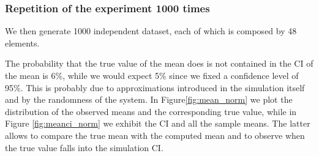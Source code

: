 \documentclass[twoside,onecolumn]{article}
\theoremstyle{definition}
\begin{document}
\subsubsection{Repetition of the experiment 1000 times}
We then generate 1000 independent dataset, each of which is composed by 48 elements. 

The probability that the true value of the mean does is not contained in the CI of the mean is 6\%, while we would expect 5\% since we fixed a confidence level of 95\%. This is probably due to approximations introduced in the simulation itself and by the randomness of the system.
In Figure\ref{fig:mean_norm} we plot the distribution of the observed means and the corresponding true value, while in Figure \ref{fig:meanci_norm} we exhibit the CI and all the sample means. The latter allows to compare the true mean with the computed mean and to observe when the true value falls into the simulation CI.
\end{document}

